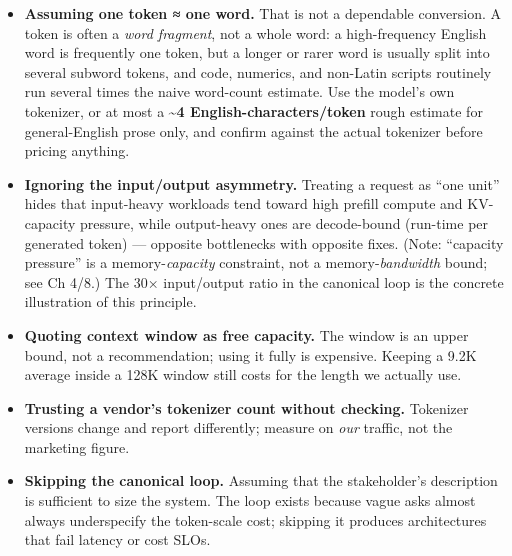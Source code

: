 \begin{itemize}
\item
  \textbf{Assuming one token ≈ one word.} That is not a dependable
  conversion. A token is often a \emph{word fragment}, not a whole word:
  a high-frequency English word is frequently one token, but a longer or
  rarer word is usually split into several subword tokens, and code,
  numerics, and non-Latin scripts routinely run several times the naive
  word-count estimate. Use the model's own tokenizer, or at most a
  \textbf{\textasciitilde4 English-characters/token} rough estimate for
  general-English prose only, and confirm against the actual tokenizer
  before pricing anything.
\item
  \textbf{Ignoring the input/output asymmetry.} Treating a request as
  ``one unit'' hides that input-heavy workloads tend toward high prefill
  compute and KV-capacity pressure, while output-heavy ones are
  decode-bound (run-time per generated token) --- opposite bottlenecks
  with opposite fixes. (Note: ``capacity pressure'' is a
  memory-\emph{capacity} constraint, not a memory-\emph{bandwidth}
  bound; see Ch 4/8.) The 30× input/output ratio in the canonical loop
  is the concrete illustration of this principle.
\item
  \textbf{Quoting context window as free capacity.} The window is an
  upper bound, not a recommendation; using it fully is expensive.
  Keeping a 9.2K average inside a 128K window still costs for the length
  we actually use.
\item
  \textbf{Trusting a vendor's tokenizer count without checking.}
  Tokenizer versions change and report differently; measure on
  \emph{our} traffic, not the marketing figure.
\item
  \textbf{Skipping the canonical loop.} Assuming that the stakeholder's
  description is sufficient to size the system. The loop exists because
  vague asks almost always underspecify the token-scale cost; skipping
  it produces architectures that fail latency or cost SLOs.
\end{itemize}

\label{architecture-consequence}


